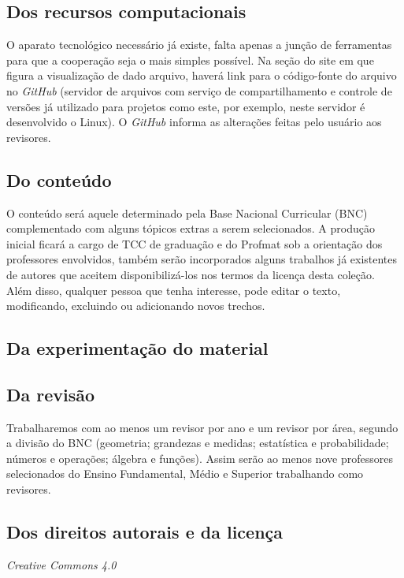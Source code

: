 \documentclass[10 pt]{article}
\begin{document}
\subsection{Dos recursos computacionais}
O aparato tecnológico necessário já existe, falta apenas a junção de ferramentas para que a cooperação seja o mais simples possível. Na seção do site em que figura a visualização de dado arquivo, haverá link para o código-fonte do arquivo no {\it GitHub} (servidor de arquivos com serviço de compartilhamento e controle de versões já utilizado para projetos como este, por exemplo, neste servidor é desenvolvido o Linux). O {\it GitHub} informa as alterações feitas pelo usuário aos revisores.

\subsection{Do conteúdo}
O conteúdo será aquele determinado pela Base Nacional Curricular (BNC) complementado com alguns tópicos extras a serem selecionados. A produção inicial ficará a cargo de TCC de graduação e do Profmat sob a orientação dos professores envolvidos, também serão incorporados alguns trabalhos já existentes de autores que aceitem disponibilizá-los nos termos da licença desta coleção. Além disso, qualquer pessoa que tenha interesse, pode  editar o texto, modificando, excluindo ou adicionando novos trechos.

\subsection{Da experimentação do material}


\subsection{Da revisão}
Trabalharemos com ao menos um revisor por ano e um revisor por área, segundo a divisão do BNC (geometria; grandezas e medidas; estatística e probabilidade; números e operações; álgebra e funções). Assim serão ao menos nove professores selecionados do Ensino Fundamental, Médio e Superior trabalhando como revisores.


\subsection{Dos direitos autorais e da licença}

{\it Creative Commons 4.0} %
\end{document}
